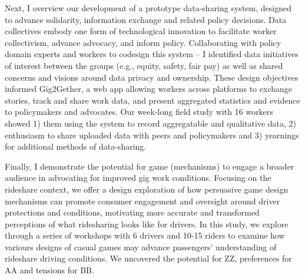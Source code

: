 Next, I overview our development of a prototype data-sharing system, designed to advance solidarity, information exchange and related policy decisions. Data collectives embody one form of technological innovation to facilitate worker collectivism, advance advocacy, and inform policy. Collaborating with policy domain experts and workers to codesign this system -- I identified data initiatives of interest between the groups (e.g., equity, safety, fair pay) as well as shared concerns and visions around data privacy and ownership. These design objectives informed Gig2Gether, a web app allowing workers across platforms to exchange stories, track and share work data, and present aggregated statistics and evidence to policymakers and advocates. Our week-long field study with 16 workers showed 1) them using the system to record aggregatable and qualitative data, 2) enthusiasm to share uploaded data with peers and policymakers and 3) yearnings for additional methods of data-sharing.

Finally, I demonstrate the potential for game (mechanisms) to engage a broader audience in advocating for improved gig work conditions. Focusing on the rideshare context, 
we offer a design exploration of how persuasive game design mechanisms can promote consumer engagement and oversight around driver protections and conditions, motivating more accurate and transformed perceptions of what ridesharing looks like for drivers. 
In this study, we explore through a series of workshops with 6 drivers and 10-15 riders to examine how variours designs of casual games may advance passengers' understanding of rideshare driving conditions.
We uncovered the potential for ZZ, preferences for AA and tensions for BB.



\vfill

\endgroup			

\vfill